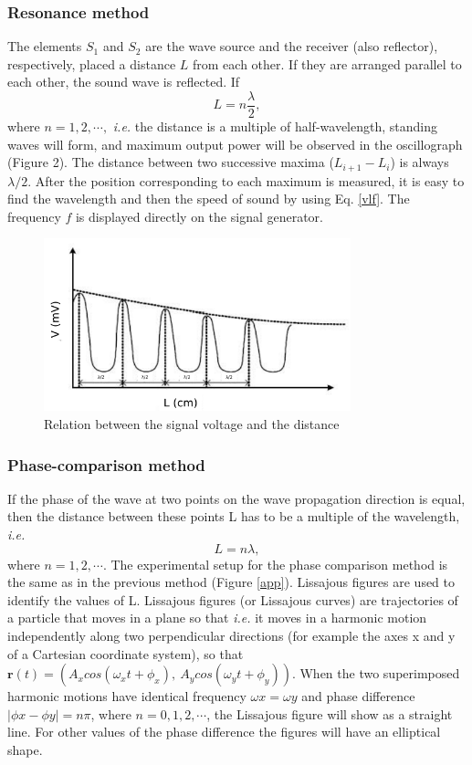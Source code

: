 \subsubsection{Resonance method}
    The elements $S_1$ and $S_2$ are the wave source and the receiver (also reflector), respectively, placed a distance $L$ from each other. If they are arranged parallel to each other, the sound wave is reflected. If
    \begin{equation}\label{equ_res}
        L=n\frac{\lambda}{2},
    \end{equation}
    where $n=1,2,\cdots,$ \emph{i.e.} the distance is a multiple of half-wavelength, standing waves will form, and maximum output power will be observed in the oscillograph (Figure 2). The distance between two successive maxima ($L_{i+1} - L_i$) is always $\lambda/2$. After the position corresponding to each maximum is measured, it is easy to find the wavelength and then the speed of sound by using Eq. \ref{vlf}. The frequency $f$ is displayed directly on the signal generator.
    \begin{figure}[h]
        \centering
        \includegraphics[height=5cm]{images/vL.png}
        \caption{Relation between the signal voltage and the distance}\label{vL}
    \end{figure}

\subsubsection{Phase-comparison method}

    If the phase of the wave at two points on the wave propagation direction is equal, then the distance between these points L has to be a multiple of the wavelength, \emph{i.e.}
    \[
        L=n\lambda,
    \]
    where $n=1,2,\cdots$. The experimental setup for the phase comparison method is the same as in the previous method (Figure \ref{app}). Lissajous figures are used to identify the values of L. Lissajous figures (or Lissajous curves) are trajectories of a particle that moves in a plane so that \emph{i.e.} it moves in a harmonic motion independently along two perpendicular directions (for example the axes x and y of a Cartesian coordinate system), so that $\textbf{r}(t) = (A_x cos(\omega_x t + \phi_x ),\ A_y cos(\omega_y t + \phi_y ))$. When the two superimposed harmonic motions have identical frequency $\omega x = \omega y$ and phase difference $|\phi x - \phi y | = n\pi$, where $n = 0, 1, 2,\cdots$, the Lissajous figure will show as a straight line. For other values of the phase difference the figures will have an elliptical shape.\\


